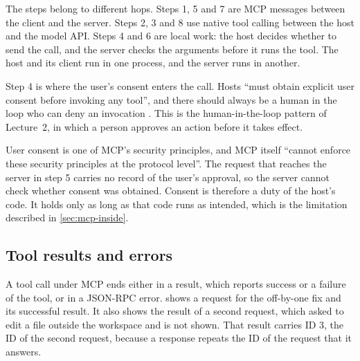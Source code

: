 The steps belong to different hops. Steps 1, 5 and 7 are MCP messages between the client and the
server. Steps 2, 3 and 8 use native tool calling between the host and the model API. Steps 4 and 6
are local work: the host decides whether to send the call, and the server checks the arguments
before it runs the tool. The host and its client run in one process, and the server runs in
another.

Step 4 is where the user's consent enters the call. Hosts ``must obtain explicit user consent
before invoking any tool'', and there should always be a human in the loop who can deny an
invocation \citep{mcp-spec-2026}. This is the human-in-the-loop pattern of Lecture~2, in which a
person approves an action before it takes effect.

User consent is one of MCP's security principles, and MCP itself ``cannot enforce these security
principles at the protocol level''. The  request that reaches the server in
step 5 carries no record of the user's approval, so the server cannot check whether consent was
obtained. Consent is therefore a duty of the host's code. It holds only as long as that code runs as
intended, which is the limitation described in \cref{sec:mcp-inside}.

\subsection{Tool results and errors}
\label{sec:mcp-results}

A tool call under MCP ends either in a result, which reports success or a failure of the tool, or in
a JSON-RPC error.  shows a  request for the off-by-one fix
and its successful result. It also shows the result of a second request, which asked to edit a file
outside the workspace and is not shown. That result carries ID 3, the ID of the second request,
because a response repeats the ID of the request that it answers.

